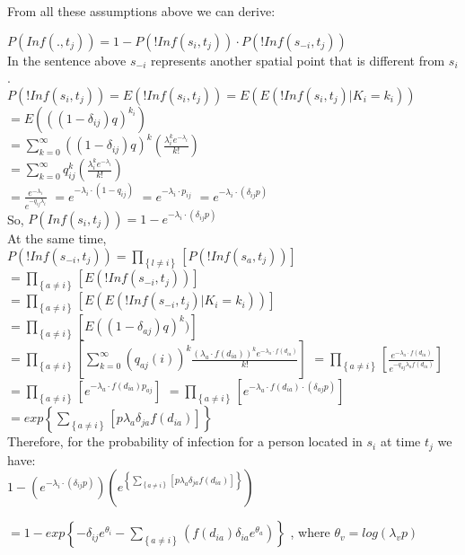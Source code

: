 \documentclass[11pt]{article}
\newcommand \mbreak {\\ \vspace{0.1in}}
\begin{document}
From all these assumptions above we can derive:


\begin{center}

    $P(Inf(.,t_j)) = 1 - P(!Inf(s_i, t_j)) \cdot  P(!Inf(s_{-i }, t_j))$ \mbreak
   In the sentence above { $ s_{-i } $ } represents another spatial point that is different from $s_{i } $. \mbreak
    $P(!Inf(s_i, t_j)) = E(!Inf(s_i, t_j)) = E(E(!Inf(s_i, t_j)|K_i=k_i))$  \mbreak
    $\displaystyle =E(((1-\delta_{ij})q)^{k_i})$  \mbreak
    $\displaystyle = \sum_{k=0}^{\infty} ((1-\delta_{ij})q)^k(\frac{\lambda_i^ke^{-\lambda_i}}{k!})$\mbreak
    $\displaystyle =  \sum_{k=0}^{\infty} q_{ij}^k (\frac{\lambda_i^ke^{-\lambda_i}}{k!})$\mbreak
    $\displaystyle = \frac{e^{-\lambda_i}}{e^{-q_{ij}\lambda_i}}$
    $ = e^{-\lambda_i\cdot(1-q_{ij})} $
    $ = e^{-\lambda_i \cdot p_{ij}} $
    $ = e^{-\lambda_i \cdot (\delta_{ij}p)}$ \mbreak
    So,  $P(Inf(s_i, t_j)) = 1 - e^{-\lambda_i \cdot (\delta_{ij}p)} $ \mbreak
    At the same time,\mbreak
    $\displaystyle P(!Inf(s_{-i}, t_j)) = \prod_{\left\{l \ne i\right\}}\left[P(!Inf(s_a, t_j)) \right]$ \mbreak
    $\displaystyle = \prod_{\left\{ a \ne i \right\}}\left[E(!Inf(s_{-i}, t_j))\right] $
    $\displaystyle = \prod_{\left\{ a \ne i \right\}}\left[E(E(!Inf(s_{-i}, t_j)|K_i=k_i)) \right]$  \mbreak
    $\displaystyle = \prod_{\left\{ a \ne i \right\}}\left[ E((1-\delta_{aj})q)^k )  \right]$\mbreak
    $\displaystyle = \prod_{\left\{ a \ne i \right\}}\left[ \sum_{k=0}^{\infty}(q_{aj}(i))^k\frac{(\lambda_a\cdot f(d_{ia}))^ke^{-\lambda_a \cdot f(d_{ia})}}{k!}    \right] $
    $\displaystyle = \prod_{\left\{ a \ne i \right\}}\left[ \frac{e^{-\lambda_a \cdot f(d_{ia})}}{e^{-q_{aj}\lambda_a f(d_{ia})}}  \right]$\mbreak
    $\displaystyle = \prod_{\left\{ a \ne i \right\}}\left[ e^{-\lambda_a \cdot f(d_{ia}) p_{aj}}  \right]$
    $\displaystyle = \prod_{\left\{ a \ne i \right\}}\left[ e^{-\lambda_a\cdot f(d_{ia}) \cdot (\delta_{aj}p) }  \right]$\mbreak
    $\displaystyle = exp\left\{\sum_{\left\{ a \ne i \right\}}\left[p\lambda_a\delta_{ja}f(d_{ia})   \right] \right\}$ \mbreak
    Therefore, for the probability of infection for a person located in $s_i$ at time $t_j$ we have: \mbreak
    $\displaystyle 1-\left(e^{-\lambda_i \cdot (\delta_{ij}p)}\right) \left(
        e^{\left\{\sum_{\left\{ a \ne i \right\}}\left[p\lambda_a\delta_{ja}f(d_{ia})   \right] \right\}}\right)
     $ \mbreak

    $\displaystyle = 1- exp\left\{-\delta_{ij}e^{\theta_{i}} - \sum_{\left\{ a \ne i  \right\}}
        (f(d_{ia})\delta_{ia}e^{\theta_{a}})   \right\}$
    , where $\theta_{v} = log(\lambda_{v}p)$

\end{center}
\end{document}
